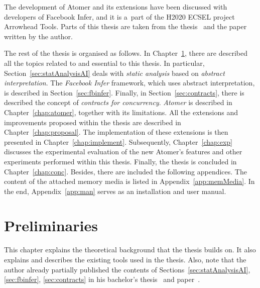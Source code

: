 The development of Atomer and its extensions have been discussed with developers of Facebook Infer, and it is a~part of the H2020 ECSEL project Arrowhead Tools. Parts of this thesis are taken from the thesis~\cite{harmimBP} and the paper~\cite{excel2021Harmim} written by the author.

The rest of the thesis is organised as follows. In Chapter~\ref{chap:prelim}, there are described all the topics related to and essential to this thesis. In particular, Section~\ref{sec:statAnalysisAI} deals with \emph{static analysis} based on \emph{abstract interpretation}. The \emph{Facebook Infer} framework, which uses abstract interpretation, is described in Section~\ref{sec:fbinfer}. Finally, in Section~\ref{sec:contracts}, there is described the concept of \emph{contracts for concurrency}. \emph{Atomer} is described in Chapter~\ref{chap:atomer}, together with its limitations. All the extensions and improvements proposed within the thesis are described in Chapter~\ref{chap:proposal}. The implementation of these extensions is then presented in Chapter~\ref{chap:implement}. Subsequently, Chapter~\ref{chap:exp} discusses the experimental evaluation of the new Atomer's features and other experiments performed within this thesis. Finally, the thesis is concluded in Chapter~\ref{chap:conc}. Besides, there are included the following appendices. The content of the attached memory media is listed in Appendix~\ref{app:memMedia}. In the end, Appendix~\ref{app:man} serves as an installation and user manual.





\chapter{Preliminaries}
\label{chap:prelim}


This chapter explains the theoretical background that the thesis builds on. It also explains and describes the existing tools used in the thesis. Also, note that the author already partially published the contents of Sections~\ref{sec:statAnalysisAI}, \ref{sec:fbinfer}, \ref{sec:contracts} in his bachelor's thesis~\cite{harmimBP} and paper~\cite{excel2021Harmim}.


